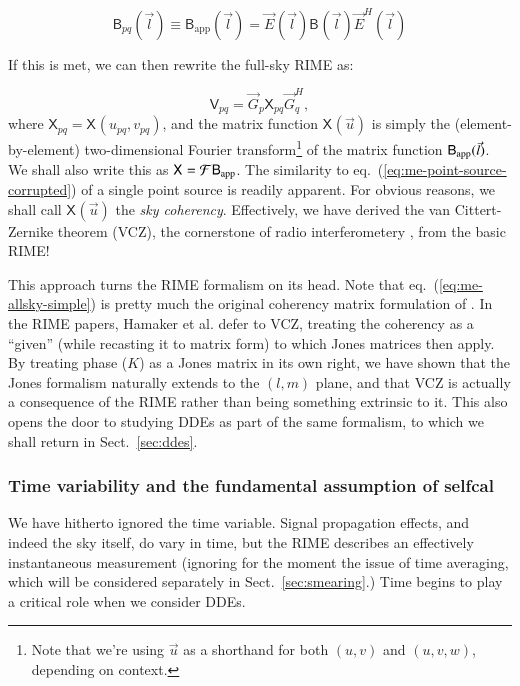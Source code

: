 \documentclass[]{aa}
\newcommand{\herm}{H}
\newcommand{\jones}[2]{\vec {#1}_{#2}}
\newcommand{\jonesT}[2]{\vec {#1}^{\herm}_{#2}}
\newcommand{\coh}[2]{\mathsf{{#1}}_{{#2}}}
\begin{document}
\[
\coh{B}{pq}(\vec l) \equiv \coh{B}{\mathrm{app}}(\vec l) =  \jones{E}{}(\vec l) \coh{B}{}(\vec l) \jonesT{E}{}(\vec l)
\]

If this is met, we can then rewrite the full-sky RIME as:

\begin{equation}\label{eq:me-allsky-simple}
\coh{V}{pq} = \jones{G}{p} \coh{X}{pq} \jonesT{G}{q},
\end{equation}
where $\coh{X}{pq} = \coh{X}{}(u_{pq},v_{pq})$, and the matrix function $\coh{X}{}(\vec u)$ is simply the (element-by-element) two-dimensional Fourier transform\footnote{Note that we're using $\vec u$ as a shorthand for both $(u,v)$ and $(u,v,w)$, depending on context.}
of the matrix function $\coh{B}{\rm app}(\vec l)$. We shall also write this as $\coh{X}{}={\cal F}\coh{B}{\mathrm{app}}$. The similarity to eq.~(\ref{eq:me-point-source-corrupted}) of a single point source is readily apparent. For obvious reasons, we shall call $\coh{X}{}(\vec u)$ the {\em sky coherency}. Effectively, we have derived the van Cittert-Zernike theorem (VCZ), the cornerstone of radio interferometery \citep[Sect.~14.1]{tms}, from the basic RIME! 

This approach turns the RIME formalism on its head. Note that eq.~(\ref{eq:me-allsky-simple}) is pretty much the original coherency matrix formulation of \citet[eq.~2]{ME4}. In the RIME papers, Hamaker et al. defer to VCZ, treating the coherency as a ``given'' (while recasting it to matrix form) to which Jones matrices then apply. By treating phase ($K$) as a Jones matrix in its own right, we have shown that the Jones formalism naturally extends to the $(l,m)$ plane, and that VCZ is actually a consequence of the RIME rather than being something extrinsic to it. This also opens the door to studying DDEs as part of the same formalism, to which we shall return in Sect.~\ref{sec:ddes}.

\subsubsection{Time variability and the fundamental assumption of selfcal\label{sec:timevar}}

We have hitherto ignored the time variable. Signal propagation effects, and indeed the sky itself, do vary in time, but the RIME describes an effectively instantaneous measurement (ignoring for the moment the issue of time averaging, which will be considered separately in Sect.~\ref{sec:smearing}.) Time begins to play a critical role when we consider DDEs. 
\end{document}
